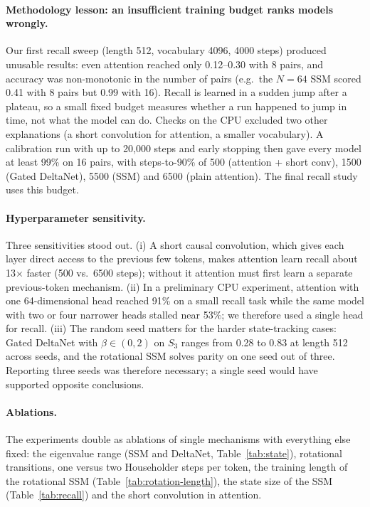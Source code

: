 \paragraph{Methodology lesson: an insufficient training budget ranks models wrongly.} Our first recall sweep
(length 512, vocabulary 4096, 4000 steps) produced unusable results: even attention reached only 0.12--0.30
with 8 pairs, and accuracy was non-monotonic in the number of pairs (e.g.\ the $N=64$ SSM scored 0.41 with 8 pairs
but 0.99 with 16). Recall is learned in a sudden jump after a plateau, so a small fixed budget measures whether a
run happened to jump in time, not what the model can do. Checks on the CPU excluded two other explanations (a
short convolution for attention, a smaller vocabulary). A calibration run with up to 20{,}000 steps and early
stopping then gave every model at least 99\% on 16 pairs, with steps-to-90\% of 500 (attention + short conv), 1500
(Gated DeltaNet), 5500 (SSM) and 6500 (plain attention). The final recall study uses this budget.

\paragraph{Hyperparameter sensitivity.} Three sensitivities stood out. (i) A short causal convolution, which gives
each layer direct access to the previous few tokens, makes attention learn recall about 13$\times$ faster (500 vs.\
6500 steps); without it attention must first learn a separate previous-token mechanism. (ii) In a preliminary CPU
experiment, attention with one 64-dimensional head reached 91\% on a small recall task while the same model with
two or four narrower heads stalled near 53\%; we therefore used a single head for recall. (iii) The random seed
matters for the harder state-tracking cases: Gated DeltaNet with $\beta\in(0,2)$ on $S_3$ ranges from 0.28 to 0.83
at length 512 across seeds, and the rotational SSM solves parity on one seed out of three. Reporting three seeds
was therefore necessary; a single seed would have supported opposite conclusions.

\paragraph{Ablations.} The experiments double as ablations of single mechanisms with everything else fixed: the
eigenvalue range (SSM and DeltaNet, Table~\ref{tab:state}), rotational transitions, one versus two Householder steps
per token, the training length of the rotational SSM (Table~\ref{tab:rotation-length}), the state size of the SSM
(Table~\ref{tab:recall}) and the short convolution in attention.

